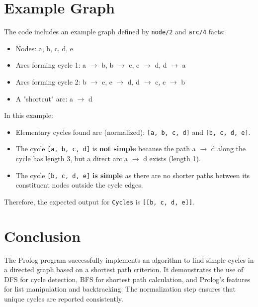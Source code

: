 \documentclass[12pt,a4paper]{article}
\begin{document}
\section{Example Graph}
The code includes an example graph defined by \texttt{node/2} and \texttt{arc/4} facts:
\begin{itemize}
    \item Nodes: a, b, c, d, e
    \item Arcs forming cycle 1: a $\rightarrow$ b, b $\rightarrow$ c, c $\rightarrow$ d, d $\rightarrow$ a
    \item Arcs forming cycle 2: b $\rightarrow$ e, e $\rightarrow$ d, d $\rightarrow$ c, c $\rightarrow$ b
    \item A "shortcut" arc: a $\rightarrow$ d
\end{itemize}
In this example:
\begin{itemize}
    \item Elementary cycles found are (normalized): \texttt{[a, b, c, d]} and \texttt{[b, c, d, e]}.
    \item The cycle \texttt{[a, b, c, d]} is \textbf{not simple} because the path a $\rightarrow$ d along the cycle has length 3, but a direct arc a $\rightarrow$ d exists (length 1).
    \item The cycle \texttt{[b, c, d, e]} \textbf{is simple} as there are no shorter paths between its constituent nodes outside the cycle edges.
\end{itemize}
Therefore, the expected output for \texttt{Cycles} is \texttt{[[b, c, d, e]]}.


\section{Conclusion}
The Prolog program successfully implements an algorithm to find simple cycles in a directed graph based on a shortest path criterion. It demonstrates the use of DFS for cycle detection, BFS for shortest path calculation, and Prolog's features for list manipulation and backtracking. The normalization step ensures that unique cycles are reported consistently.
\end{document}

